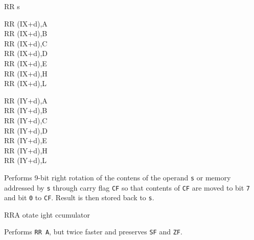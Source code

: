 \begin{basedescript}{
    \desclabelstyle{\multilinelabel}
    \desclabelwidth{3cm}}
\begin{DetailItem}{RR s}
\begin{DetailVariants}
            \columnbreak
            RR (IX+d),A\UNDOC\\
            RR (IX+d),B\UNDOC\\
            RR (IX+d),C\UNDOC\\
            RR (IX+d),D\UNDOC\\
            RR (IX+d),E\UNDOC\\
            RR (IX+d),H\UNDOC\\
            RR (IX+d),L\UNDOC

            \columnbreak
            RR (IY+d),A\UNDOC\\
            RR (IY+d),B\UNDOC\\
            RR (IY+d),C\UNDOC\\
            RR (IY+d),D\UNDOC\\
            RR (IY+d),E\UNDOC\\
            RR (IY+d),H\UNDOC\\
            RR (IY+d),L\UNDOC
        \end{DetailVariants}

        Performs 9-bit right rotation of the contens of the operand {\tt s} or memory addressed by {\tt s} through carry flag {\tt CF} so that contents of {\tt CF} are moved to bit {\tt 7} and bit {\tt 0} to {\tt CF}. Result is then stored back to {\tt s}.

        \begin{DetailEffects}[p]
            \FlagsRRr
        \end{DetailEffects}
						
        \begin{DetailTiming}
        \end{DetailTiming}

    \end{DetailItem}

    \begin{DetailItem}{RRA}
        {otate ight ccumulator}
        {}

        Performs {\tt RR A}, but twice faster and preserves {\tt SF} and {\tt ZF}.

        \begin{DetailEffects}
            \FlagsRRA
        \end{DetailEffects}
						
        \begin{DetailTiming}
        \end{DetailTiming}


\end{DetailItem}
\end{basedescript}
